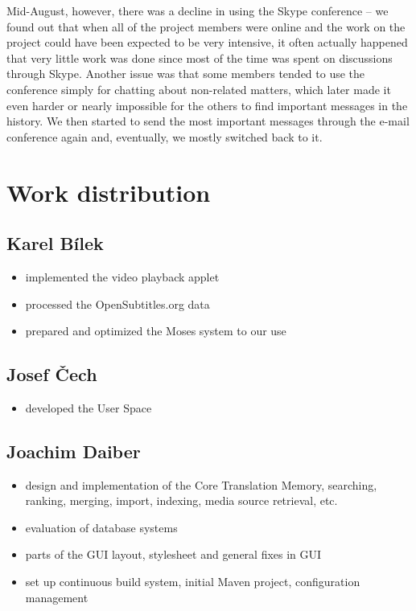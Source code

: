 {Mid-August, however, there was a decline in using the Skype conference -- we found out that when all of the project members were online and the work on the project could have been expected to be very intensive, it often actually happened that very little work was done since most of the time was spent on discussions through Skype.
Another issue was that some members tended to use the conference simply for chatting about non-related matters, %
which later made it even harder or nearly impossible for the others to find important messages in the history.
We then started to send the most important messages through the e-mail conference again and, eventually, we mostly switched back to it.


\section{Work distribution}

\subsection*{Karel Bílek}

\begin{itemize}
	\item implemented the video playback applet
	\item processed the OpenSubtitles.org data
	\item prepared and optimized the Moses system to our use
\end{itemize}

\subsection*{Josef Čech}

\begin{itemize}
	\item developed the User Space
\end{itemize}

\subsection*{Joachim Daiber}

\begin{itemize}
	\item design and implementation of the Core Translation Memory, searching, ranking, merging, import, indexing, media source retrieval, etc.
	\item evaluation of database systems
	\item parts of the GUI layout, stylesheet and general fixes in GUI
	\item set up continuous build system, initial Maven project, configuration management
\end{itemize}



}
